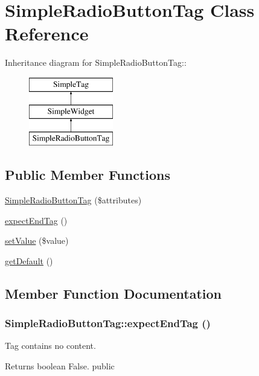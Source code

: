\hypertarget{class_simple_radio_button_tag}{
\section{SimpleRadioButtonTag Class Reference}
\label{class_simple_radio_button_tag}
}
Inheritance diagram for SimpleRadioButtonTag::\begin{figure}[H]
\begin{center}
\leavevmode
\includegraphics[height=3cm]{class_simple_radio_button_tag}
\end{center}
\end{figure}
\subsection*{Public Member Functions}
\begin{DoxyCompactItemize}
\item 
\hyperlink{class_simple_radio_button_tag_a82658eec3537173c26d57441bc0e5d47}{SimpleRadioButtonTag} (\$attributes)
\item 
\hyperlink{class_simple_radio_button_tag_a16eb9fffec50e8aa90caed5c838a2f0a}{expectEndTag} ()
\item 
\hyperlink{class_simple_radio_button_tag_a501c46e35c07e6d509aff9576eeda833}{setValue} (\$value)
\item 
\hyperlink{class_simple_radio_button_tag_ac6c12af9e40ad20addeecb398e92f95d}{getDefault} ()
\end{DoxyCompactItemize}


\subsection{Member Function Documentation}
\hypertarget{class_simple_radio_button_tag_a16eb9fffec50e8aa90caed5c838a2f0a}{
\subsubsection[{expectEndTag}]{\setlength{\rightskip}{0pt plus 5cm}SimpleRadioButtonTag::expectEndTag ()}}
\label{class_simple_radio_button_tag_a16eb9fffec50e8aa90caed5c838a2f0a}
Tag contains no content. \begin{DoxyReturn}{Returns}
boolean False.  public 
\end{DoxyReturn}


